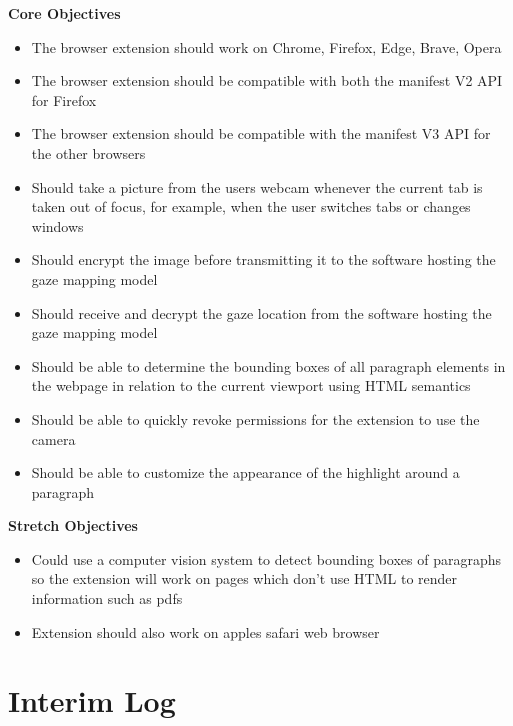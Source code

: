 \documentclass[twocolumn]{report}
\begin{document}
\textbf{Core Objectives}

\begin{itemize}
    \item The browser extension should work on Chrome, Firefox, Edge, Brave, Opera
    \item The browser extension should be compatible with both the manifest V2 API for Firefox
    \item The browser extension should be compatible with the manifest V3 API for the other browsers 
    \item Should take a picture from the users webcam whenever the current tab is taken out of focus, for example, when the user switches tabs or changes windows 
    \item Should encrypt the image before transmitting it to the software hosting the gaze mapping model 
    \item Should receive and decrypt the gaze location from the software hosting the gaze mapping model 
    \item Should be able to determine the bounding boxes of all paragraph elements in the webpage in relation to the current viewport using HTML semantics
    \item Should be able to quickly revoke permissions for the extension to use the camera 
    \item Should be able to customize the appearance of the highlight around a paragraph 
\end{itemize}

\textbf{Stretch Objectives}

\begin{itemize}
    \item Could use a computer vision system to detect bounding boxes of paragraphs so the extension will work on pages which don't use HTML to render information such as pdfs 
    \item Extension should also work on apples safari web browser  
\end{itemize}



\chapter{Interim Log}
\end{document}
